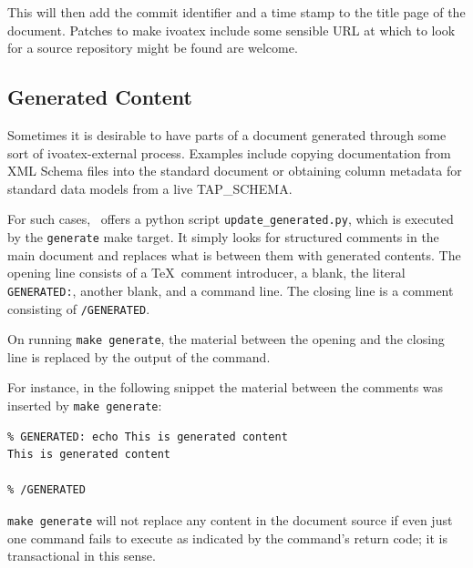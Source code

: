 \documentclass[11pt,a4paper]{ivoa}
\begin{document}

This will then add the commit identifier and a time stamp to the title
page of the document.  Patches to make ivoatex include some sensible URL
at which to look for a source repository might be found are welcome.


\subsection{Generated Content}
\label{sect:generated}

Sometimes it is desirable to have parts of a document generated through
some sort of ivoatex-external process.  Examples include copying
documentation from XML Schema files into the standard document
or obtaining column metadata for standard
data models from a live TAP\_SCHEMA.

For such cases, \ivoatex\ offers a python script
\texttt{update\_generated.py}, which is executed by the
\texttt{generate} make target.  It simply looks for structured comments
in the main document and replaces what is between them with generated
contents.  The opening line consists of a \TeX~comment introducer, a
blank, the literal \texttt{GENERATED:}, another blank, and a command
line.  The closing line is a comment consisting of \texttt{/GENERATED}.

On running \texttt{make generate}, the material between the opening and
the closing line is replaced by the output of the command.

For instance, in the following snippet the material between the comments
was inserted by \texttt{make generate}:

\begin{lstlisting}
% GENERATED: echo This is generated content
This is generated content

% /GENERATED
\end{lstlisting}

\texttt{make generate} will not replace any content in the document source
if even just one command fails to execute as indicated by the
command's return code; it is transactional in this sense.
\end{document}
